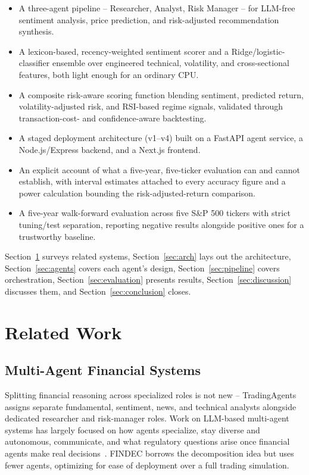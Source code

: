 \documentclass[conference]{IEEEtran}
\begin{document}
\begin{itemize}
\item A three-agent pipeline -- Researcher, Analyst, Risk Manager -- for LLM-free sentiment analysis, price prediction, and risk-adjusted recommendation synthesis.
\item A lexicon-based, recency-weighted sentiment scorer and a Ridge/logistic-classifier ensemble over engineered technical, volatility, and cross-sectional features, both light enough for an ordinary CPU.
\item A composite risk-aware scoring function blending sentiment, predicted return, volatility-adjusted risk, and RSI-based regime signals, validated through transaction-cost- and confidence-aware backtesting.
\item A staged deployment architecture (v1--v4) built on a FastAPI agent service, a Node.js/Express backend, and a Next.js frontend.
\item An explicit account of what a five-year, five-ticker evaluation can and cannot establish, with interval estimates attached to every accuracy figure and a power calculation bounding the risk-adjusted-return comparison.
\item A five-year walk-forward evaluation across five S\&P 500 tickers with strict tuning/test separation, reporting negative results alongside positive ones for a trustworthy baseline.
\end{itemize}

Section~\ref{sec:related} surveys related systems, Section~\ref{sec:arch} lays out the architecture, Section~\ref{sec:agents} covers each agent's design, Section~\ref{sec:pipeline} covers orchestration, Section~\ref{sec:evaluation} presents results, Section~\ref{sec:discussion} discusses them, and Section~\ref{sec:conclusion} closes.

\section{Related Work}
\label{sec:related}

\subsection{Multi-Agent Financial Systems}

Splitting financial reasoning across specialized roles is not new -- TradingAgents~\cite{xiao2024tradingagents} assigns separate fundamental, sentiment, news, and technical analysts alongside dedicated researcher and risk-manager roles. Work on LLM-based multi-agent systems has largely focused on how agents specialize, stay diverse and autonomous, communicate, and what regulatory questions arise once financial agents make real decisions~\cite{lee2025large, liu2026large}. FINDEC borrows the decomposition idea but uses fewer agents, optimizing for ease of deployment over a full trading simulation.
\end{document}
